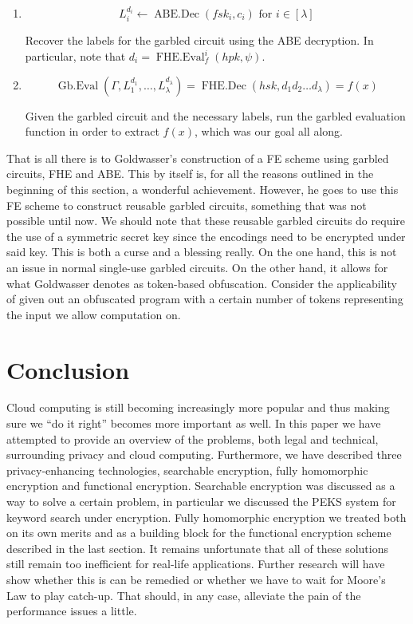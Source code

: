 \documentclass[11pt, a4paper]{article}
\newcommand{\op}[1]{\operatorname{#1}}
\begin{document}
\begin{enumerate}
    \item
        \[
            L_i^{d_i} \gets \op{ABE.Dec}(fsk_i, c_i) \text{ for } i \in [\lambda]
        \]

        Recover the labels for the garbled circuit using the ABE decryption. In particular, note that $d_i = \op{FHE.Eval}_f^i(hpk, \psi)$.
    \item
        \[
            \op{Gb.Eval}(\Gamma, L_1^{d_1}, \dots, L_{\lambda}^{d_{\lambda}}) = \op{FHE.Dec}(hsk, d_1 d_2 \dots d_{\lambda}) = f(x)
        \]

        Given the garbled circuit and the necessary labels, run the garbled evaluation function in order to extract $f(x)$, which was our goal all along.
\end{enumerate}

That is all there is to Goldwasser's construction of a FE scheme using garbled circuits, FHE and ABE. 
This by itself is, for all the reasons outlined in the beginning of this section, a wonderful achievement. 
However, he goes to use this FE scheme to construct reusable garbled circuits, something that was not possible until now.
We should note that these reusable garbled circuits do require the use of a symmetric secret key since the encodings need to be encrypted under said key.
This is both a curse and a blessing really.
On the one hand, this is not an issue in normal single-use garbled circuits.
On the other hand, it allows for what Goldwasser denotes as token-based obfuscation.
Consider the applicability of given out an obfuscated program with a certain number of tokens representing the input we allow computation on.

\section{Conclusion}
\label{sec:conclusion}

Cloud computing is still becoming increasingly more popular and thus making sure we ``do it right'' becomes more important as well.
In this paper we have attempted to provide an overview of the problems, both legal and technical, surrounding privacy and cloud computing.
Furthermore, we have described three privacy-enhancing technologies, searchable encryption, fully homomorphic encryption and functional encryption.
Searchable encryption was discussed as a way to solve a certain problem, in particular we discussed the PEKS system for keyword search under encryption.
Fully homomorphic encryption we treated both on its own merits and as a building block for the functional encryption scheme described in the last section. 
It remains unfortunate that all of these solutions still remain too inefficient for real-life applications.
Further research will have show whether this is can be remedied or whether we have to wait for Moore's Law to play catch-up.
That should, in any case, alleviate the pain of the performance issues a little.
\end{document}
